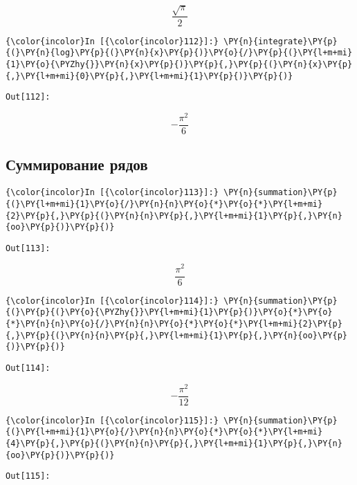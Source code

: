     \[\frac{\sqrt{\pi}}{2}\]

    

    \begin{Verbatim}[commandchars=\\\{\}]
{\color{incolor}In [{\color{incolor}112}]:} \PY{n}{integrate}\PY{p}{(}\PY{n}{log}\PY{p}{(}\PY{n}{x}\PY{p}{)}\PY{o}{/}\PY{p}{(}\PY{l+m+mi}{1}\PY{o}{\PYZhy{}}\PY{n}{x}\PY{p}{)}\PY{p}{,}\PY{p}{(}\PY{n}{x}\PY{p}{,}\PY{l+m+mi}{0}\PY{p}{,}\PY{l+m+mi}{1}\PY{p}{)}\PY{p}{)}
\end{Verbatim}
\texttt{\color{outcolor}Out[{\color{outcolor}112}]:}
    
    \[- \frac{\pi^{2}}{6}\]

    

\subsection{Суммирование рядов}
\label{sympy09}

    \begin{Verbatim}[commandchars=\\\{\}]
{\color{incolor}In [{\color{incolor}113}]:} \PY{n}{summation}\PY{p}{(}\PY{l+m+mi}{1}\PY{o}{/}\PY{n}{n}\PY{o}{*}\PY{o}{*}\PY{l+m+mi}{2}\PY{p}{,}\PY{p}{(}\PY{n}{n}\PY{p}{,}\PY{l+m+mi}{1}\PY{p}{,}\PY{n}{oo}\PY{p}{)}\PY{p}{)}
\end{Verbatim}
\texttt{\color{outcolor}Out[{\color{outcolor}113}]:}
    
    \[\frac{\pi^{2}}{6}\]

    

    \begin{Verbatim}[commandchars=\\\{\}]
{\color{incolor}In [{\color{incolor}114}]:} \PY{n}{summation}\PY{p}{(}\PY{p}{(}\PY{o}{\PYZhy{}}\PY{l+m+mi}{1}\PY{p}{)}\PY{o}{*}\PY{o}{*}\PY{n}{n}\PY{o}{/}\PY{n}{n}\PY{o}{*}\PY{o}{*}\PY{l+m+mi}{2}\PY{p}{,}\PY{p}{(}\PY{n}{n}\PY{p}{,}\PY{l+m+mi}{1}\PY{p}{,}\PY{n}{oo}\PY{p}{)}\PY{p}{)}
\end{Verbatim}
\texttt{\color{outcolor}Out[{\color{outcolor}114}]:}
    
    \[- \frac{\pi^{2}}{12}\]

    

    \begin{Verbatim}[commandchars=\\\{\}]
{\color{incolor}In [{\color{incolor}115}]:} \PY{n}{summation}\PY{p}{(}\PY{l+m+mi}{1}\PY{o}{/}\PY{n}{n}\PY{o}{*}\PY{o}{*}\PY{l+m+mi}{4}\PY{p}{,}\PY{p}{(}\PY{n}{n}\PY{p}{,}\PY{l+m+mi}{1}\PY{p}{,}\PY{n}{oo}\PY{p}{)}\PY{p}{)}
\end{Verbatim}
\texttt{\color{outcolor}Out[{\color{outcolor}115}]:}
    
